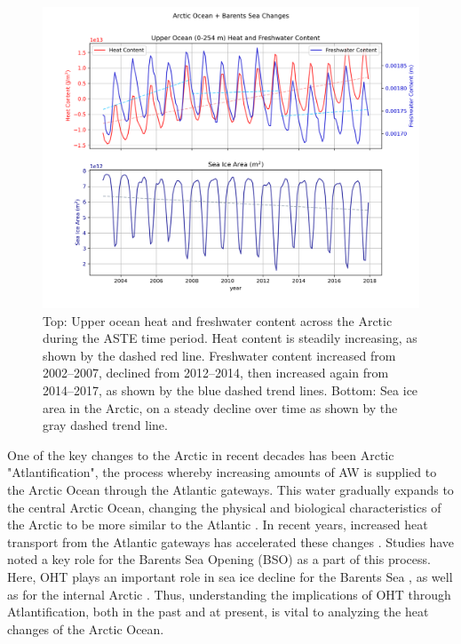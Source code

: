 \documentclass[a4paper,12pt]{article}
\begin{document}
        \begin{figure} %
        \centering
        \includegraphics[width=\linewidth]{../figures/Arctic_timeseries_proposal.png}
        \caption{Top: Upper ocean heat and freshwater content across the Arctic during the ASTE time period. Heat content is steadily increasing, as shown by the dashed red line. Freshwater content increased from 2002--2007, declined from 2012--2014, then increased again from 2014--2017, as shown by the blue dashed trend lines. Bottom: Sea ice area in the Arctic, on a steady decline over time as shown by the gray dashed trend line.}
        \label{fig:arctictimeseries}
        \end{figure}


        One of the key changes to the Arctic in recent decades has been Arctic "Atlantification", the process whereby increasing amounts of AW is supplied to the Arctic Ocean through the Atlantic gateways. This water gradually expands to the central Arctic Ocean, changing the physical and biological characteristics of the Arctic to be more similar to the Atlantic \cite{Ingvaldsen2021}. In recent years, increased heat transport from the Atlantic gateways has accelerated these changes \cite{Arthun2012}. Studies have noted a key role for the Barents Sea Opening (BSO) as a part of this process. Here, OHT plays an important role in sea ice decline for the Barents Sea \cite{Li2017,Lind2018}, as well as for the internal Arctic \cite{Arthun2019}. Thus, understanding the implications of OHT through Atlantification, both in the past and at present, is vital to analyzing the heat changes of the Arctic Ocean.
\end{document}

